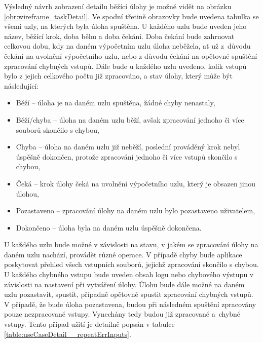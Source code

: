 Výsledný návrh zobrazení detailu běžící úlohy je možné vidět na obrázku \ref{obr:wireframe_taskDetail}. Ve spodní třetině obrazovky bude uvedena tabulka se všemi uzly, na kterých byla úloha spuštěna. U každého uzlu bude uveden jeho název, běžící krok, doba běhu a doba čekání. Doba čekání bude zahrnovat celkovou dobu, kdy na daném výpočetním uzlu úloha neběžela, ať už z~důvodu čekání na uvolnění výpočetního uzlu, nebo z důvodu čekání na opětovné spuštění zpracování chybných vstupů. Dále bude u každého uzlu uvedeno, kolik vstupů bylo z jejich celkového počtu již zpracováno, a stav úlohy, který může být následující:
\begin{itemize}
    \item Běží -- úloha je na daném uzlu spuštěna, žádné chyby nenastaly,
    \item Běží/chyba -- úloha na daném uzlu běží, avšak zpracování jednoho či více souborů skončilo s chybou,
    \item Chyba --  úloha na daném uzlu již neběží, poslední prováděný krok nebyl úspěšně dokončen, protože zpracování jednoho či více vstupů skončilo s chybou,
    \item Čeká -- krok úlohy čeká na uvolnění výpočetního uzlu, který je obsazen jinou úlohou,
    \item Pozastaveno -- zpracování úlohy na daném uzlu bylo pozastaveno uživatelem,
    \item Dokončeno -- úloha byla na daném uzlu úspěšně dokončena.
\end{itemize}
U každého uzlu bude možné v závislosti na stavu, v jakém se zpracování úlohy na daném uzlu nachází, provádět různé operace. V případě chyby bude aplikace poskytovat přehled všech vstupních souborů, jejichž zpracování skončilo s chybou. U každého chybného vstupu bude uveden obsah logu nebo chybového výstupu v závislosti na nastavení při vytváření úlohy. Úlohu bude dále možné na daném uzlu pozastavit, spustit, případně opětovně spustit zpracování chybných vstupů. V případě, že bude úloha pozastavena, budou při následném spuštění zpracovány pouze nezpracované vstupy. Vynechány tedy budou již zpracované a~chybné vstupy. Tento případ užití je detailně popsán v tabulce \ref{table:useCaseDetail__repeatErrInputs}.

